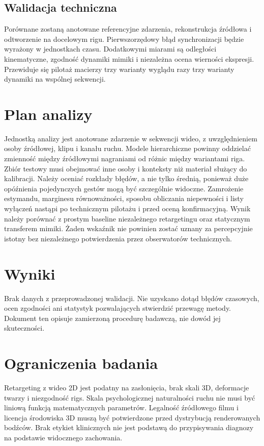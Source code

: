 \documentclass[11pt,a4paper]{article}
\begin{document}
\subsection{Walidacja techniczna}
Porównane zostaną anotowane referencyjne zdarzenia, rekonstrukcja źródłowa i odtworzenie na docelowym rigu. Pierwszorzędowy błąd synchronizacji będzie wyrażony w jednostkach czasu. Dodatkowymi miarami są odległości kinematyczne, zgodność dynamiki mimiki i niezależna ocena wierności ekspresji. Przewiduje się pilotaż macierzy trzy warianty wyglądu razy trzy warianty dynamiki na wspólnej sekwencji.
\section{Plan analizy}
Jednostką analizy jest anotowane zdarzenie w sekwencji wideo, z uwzględnieniem osoby źródłowej, klipu i kanału ruchu. Modele hierarchiczne powinny oddzielać zmienność między źródłowymi nagraniami od różnic między wariantami riga. Zbiór testowy musi obejmować inne osoby i konteksty niż materiał służący do kalibracji. Należy oceniać rozkłady błędów, a nie tylko średnią, ponieważ duże opóźnienia pojedynczych gestów mogą być szczególnie widoczne.
Zamrożenie estymandu, marginesu równoważności, sposobu obliczania niepewności i listy wyłączeń nastąpi po technicznym pilotażu i przed oceną konfirmacyjną. Wynik należy porównać z prostym baseline niezależnego retargetingu oraz statycznym transferem mimiki. Żaden wskaźnik nie powinien zostać uznany za percepcyjnie istotny bez niezależnego potwierdzenia przez obserwatorów technicznych.
\section{Wyniki}
Brak danych z przeprowadzonej walidacji. Nie uzyskano dotąd błędów czasowych, ocen zgodności ani statystyk pozwalających stwierdzić przewagę metody. Dokument ten opisuje zamierzoną procedurę badawczą, nie dowód jej skuteczności.
\section{Ograniczenia badania}
Retargeting z wideo 2D jest podatny na zasłonięcia, brak skali 3D, deformacje twarzy i niezgodność rigs. Skala psychologicznej naturalności ruchu nie musi być liniową funkcją matematycznych parametrów. Legalność źródłowego filmu i licencja środowiska 3D muszą być potwierdzone przed dystrybucją renderowanych bodźców. Brak etykiet klinicznych nie jest podstawą do przypisywania diagnozy na podstawie widocznego zachowania.
\end{document}
